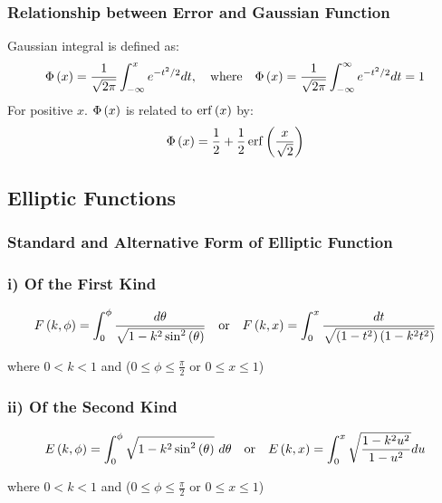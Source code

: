 \subsubsection{Relationship between Error and Gaussian Function}
Gaussian integral is defined as:
\begin{equation}
    \Phi\left(x\right)=\frac{1}{\sqrt{2\pi}}\int_{-\infty}^{x}e^{-t^2/2}dt,\quad\text{where}\quad\Phi\left(x\right)=\frac{1}{\sqrt{2\pi}}\int_{-\infty}^{\infty}e^{-t^2/2}dt=1
\end{equation}
For positive $x$. $\Phi\left(x\right)$ is related to $\erff{x}$ by:
\begin{equation}
    \Phi\bracket{x}=\frac{1}{2}+\frac{1}{2}\erff{\frac{x}{\sqrt{2}}}
\end{equation}
\subsection{Elliptic Functions}
\subsubsection{Standard and Alternative Form of Elliptic Function}
\subsubsection*{i) Of the First Kind}
\begin{equation}\label{eqn:3.13}
    F\left(k,\phi\right)=\int_{0}^{\phi}\frac{d\theta}{\sqrt{1-k^2\sin^{2}\left(\theta\right)}}\quad\text{or}\quad F\left(k,x\right)=\int_{0}^{x}\frac{dt}{\sqrt{\left(1-t^2\right)\left(1-k^2t^2\right)}}
\end{equation}
\begin{center}
    where $0<k<1$ and ($0\leq\phi\leq\frac{\pi}{2}$ or $0\leq x\leq 1$)
\end{center}
\subsubsection*{ii) Of the Second Kind}
\begin{equation}\label{eqn:3.14}
    E\bracket{k,\phi}=\intt{0}{\phi}\sqrt{1-k^2\sinnN{2}{\theta}}\ d\theta\quad\text{or}\quad E\bracket{k,x}=\intt{0}{x}\sqrt{\frac{1-k^2u^2}{1-u^2}}du
\end{equation}
\begin{center}
    where $0<k<1$ and ($0\leq\phi\leq\frac{\pi}{2}$ or $0\leq x\leq 1$)
\end{center}
